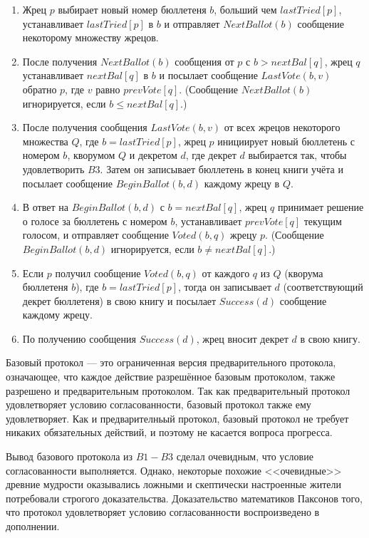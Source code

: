 \documentclass[12pt, a4paper]{article} %
\begin{document}
\begin{enumerate}
    \item Жрец $p$ выбирает новый номер бюллетеня $b$, больший чем $lastTried[p]$, устанавливает $lastTried[p]$ в $b$ и отправляет $NextBallot(b)$ сообщение некоторому множеству жрецов.
   
   \item После получения $NextBallot(b)$ сообщения от $p$ с $b > nextBal[q]$, жрец $q$ устанавливает $nextBal[q]$ в $b$ и посылает сообщение $LastVote(b, v)$ обратно $p$, где $v$ равно $prevVote[q]$. (Сообщение $NextBallot(b)$ игнорируется, если $b \leqslant nextBal[q]$.)
   
   \item После получения сообщения $LastVote(b, v)$ от всех жрецов некоторого множества $Q$, где $b = lastTried[p]$, жрец $p$ инициирует новый бюллетень с номером $b$, кворумом $Q$ и декретом $d$, где декрет $d$ выбирается так, чтобы удовлетворить $B3$. Затем он записывает бюллетень в конец книги учёта и посылает сообщение $BeginBallot(b, d)$ каждому жрецу в $Q$.
   
   \item В ответ на $BeginBallot(b, d)$ с $b = nextBal[q]$, жрец $q$ принимает решение о голосе за бюллетень с номером $b$, устанавливает $prevVote[q]$ текущим голосом, и  отправляет сообщение $Voted(b, q)$ жрецу $p$. (Сообщение $BeginBallot(b, d)$ игнорируется, если $b \neq nextBal[q]$.)
    
    \item Если $p$ получил сообщение $Voted(b, q)$ от каждого $q$ из $Q$ (кворума бюллетеня $b$), где $b = lastTried[p]$, тогда он записывает $d$ (соответствующий декрет бюллетеня) в свою книгу и посылает $Success(d)$ сообщение каждому жрецу.

    \item По получению сообщения $Success(d)$, жрец вносит декрет $d$ в свою книгу.
\end{enumerate}

Базовый протокол --- это ограниченная версия предварительного протокола, означающее, что каждое действие разрешённое базовым протоколом, также разрешено и предварительным протоколом. Так как предварительный протокол удовлетворяет условию согласованности, базовый протокол также ему удовлетворяет. Как и предварителньый протокол, базовый протокол не требует никаких обязательных действий, и поэтому не касается вопроса прогресса.

Вывод базового протокола из $B1 - B3$ сделал очевидным, что условие согласованности выполняется. Однако, некоторые похожие <<очевидные>> древние мудрости оказывались ложными и скептически настроенные жители потребовали строгого доказательства. Доказательство математиков Паксонов того, что протокол удовлетворяет условию согласованности воспроизведено в дополнении.
\end{document}
